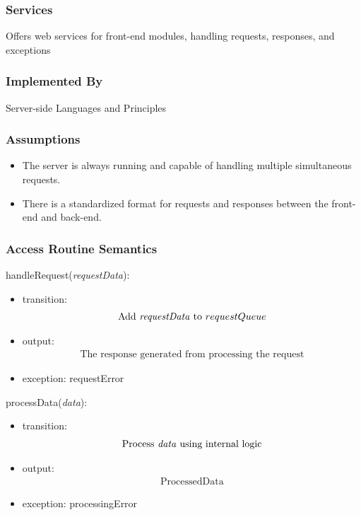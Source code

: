 \documentclass[12pt, titlepage]{article}
\begin{document}
\subsubsection{Services}
Offers web services for front-end modules, handling requests, responses, and exceptions

\subsubsection{Implemented By}
Server-side Languages and Principles

\subsubsection{Assumptions}

\begin{itemize}
  \item The server is always running and capable of handling multiple simultaneous requests.
  \item There is a standardized format for requests and responses between the front-end and back-end.
\end{itemize}

\subsubsection{Access Routine Semantics}

\noindent handleRequest(\textit{requestData}):
\begin{itemize}
\item transition: 
\begin{align*}
\text{Add \textit{requestData} to } requestQueue
\end{align*}

\item output: 
\begin{align*}
\text{The response generated from processing the request}
\end{align*}

\item exception: requestError
\end{itemize}

\noindent processData(\textit{data}):
\begin{itemize}
\item transition: 
\begin{align*}
\text{Process \textit{data} using internal logic}
\end{align*}

\item output: 
\begin{align*}
\text{ProcessedData}
\end{align*}

\item exception: processingError
\end{itemize}
\end{document}
